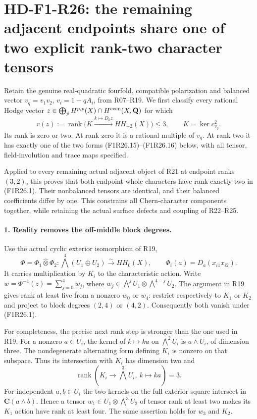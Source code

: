 \section[HD-F1-R26: the exact rank-two character gate]{HD-F1-R26: the remaining adjacent endpoints share one of two explicit rank-two character tensors}
\label{sec:followup-rm-rank-two-character-gate}

Retain the genuine real-quadratic fourfold, compatible
polarization and balanced vector
$v_q=v_1v_2$, $v_i=1-qA_i$, from R07--R19.
We first classify every rational Hodge vector
$z\in\bigoplus_pH^{p,p}(X)\cap H^{\rm even}(X,\mathbf Q)$
for which
\[
                  r(z):=\operatorname{rank}
                     \bigl(K\xrightarrow{k\mapsto D_kz}HH_{-2}(X)\bigr)
                                      \le3,\qquad K=\ker c^2_{v_q}.
 \tag{F1R26.1}
\]
Its rank is zero or two. At rank zero it is a rational
multiple of $v_q$. At rank two it has exactly one of
the two forms (F1R26.15)--(F1R26.16) below, with
all tensor, field-involution and trace maps specified.

Applied to every remaining actual adjacent object
of R21 at endpoint ranks $(3,2)$, this proves that
both endpoint whole characters have rank exactly two
in (F1R26.1). Their nonbalanced tensors are identical,
and their balanced coefficients differ by one.
This constrains all Chern-character components
together, while retaining the actual surface
defects and coupling of R22--R25.

\paragraph{1. Reality removes the off-middle block degrees.}
Use the actual cyclic exterior isomorphism of R19,
\[
 \Phi=\Phi_1\widehat\otimes\Phi_2:
       \bigwedge^4(U_1\oplus U_2)\xrightarrow{\sim}HH_0(X),
 \qquad
 \Phi_i(a)=D_a(x_{i1}x_{i2}).
 \tag{F1R26.2}
\]
It carries multiplication by $K_i$ to the
characteristic action. Write
$w=\Phi^{-1}(z)=\sum_{j=0}^4w_j$, where
$w_j\in\bigwedge^jU_1\otimes\bigwedge^{4-j}U_2$.
The argument in R19 gives rank at least five
from a nonzero $w_0$ or $w_4$: restrict respectively
to $K_1$ or $K_2$ and project to block degrees
$(2,4)$ or $(4,2)$. Consequently both vanish
under (F1R26.1).

For completeness, the precise next rank step is
stronger than the one used in R19.
For a nonzero $a\in U_i$, the kernel of
$k\mapsto ka$ on $\bigwedge^2U_i$ is
$a\wedge U_i$, of dimension three.
The nondegenerate alternating form defining $K_i$
is nonzero on that subspace. Thus its intersection
with $K_i$ has dimension two and
\[
                    \operatorname{rank}(K_i\to\bigwedge^3U_i,
                                              \ k\mapsto ka)=3.
 \tag{F1R26.3}
\]
For independent $a,b\in U_i$ the two kernels on
the full exterior square intersect in
$\mathbf C(a\wedge b)$. Hence a tensor
$w_1\in U_1\otimes\bigwedge^3U_2$ of tensor rank
at least two makes its $K_1$ action have rank at
least four. The same assertion holds for $w_3$
and $K_2$.

